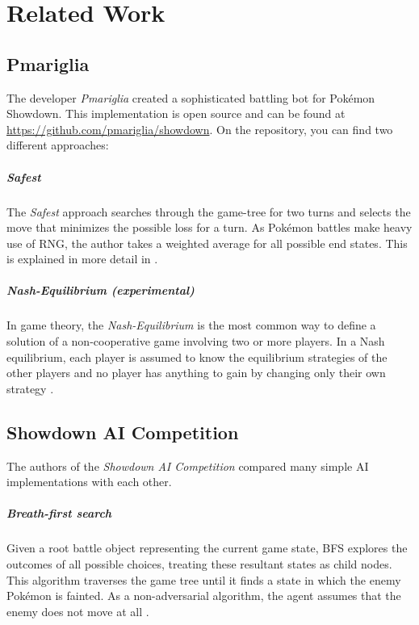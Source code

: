 
\chapter{Related Work}
\label{ch:relatedwork}


\section{Pmariglia}
The developer \textit{Pmariglia}\cite{Github:pmariglia-showdown} created a sophisticated
battling bot for Pokémon Showdown. This implementation is open source and can be found 
at \url{https://github.com/pmariglia/showdown}. On the repository, you can find two 
different approaches: \\

\paragraph{Safest}
The \textit{Safest} approach searches through the game-tree for two turns and selects the 
move that minimizes the possible loss for a turn. As Pokémon battles make heavy use of
\ac{RNG}, the author takes a weighted average for all possible end states. This is explained
in more detail in .

\paragraph{Nash-Equilibrium (experimental)}
In game theory, the \textit{Nash-Equilibrium} is the most common way to define a solution
of a non-cooperative game involving two or more players.  In a Nash equilibrium, each player 
is assumed to know the equilibrium strategies of the other players and no player has 
anything to gain by changing only their own strategy \cite{wiki:Nash_equilibrium}.

\section{Showdown AI Competition}
The authors of the \textit{Showdown AI Competition}\cite{Lee_Togelius_2017} compared many
simple AI implementations with each other. 
\paragraph{Breath-first search}
\label{sec:showdown-competition-bfs}
Given a root battle object representing the current game state, \ac{BFS} explores the
outcomes of all possible choices, treating these resultant states as child nodes. This
algorithm traverses the game tree until it finds a state in which the enemy Pokémon is
fainted. As a non-adversarial algorithm, the agent assumes that the enemy does not 
move at all \cite{Lee_Togelius_2017}. 

